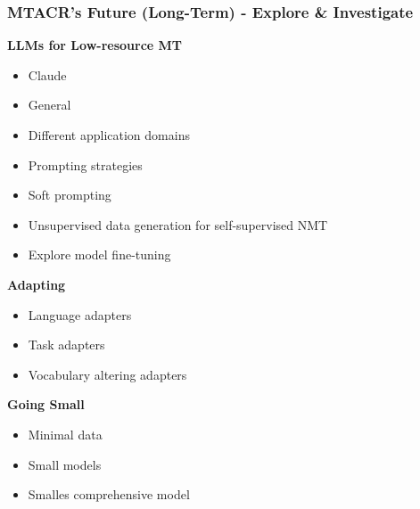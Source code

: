 \documentclass[aspectratio=169]{beamer}
\begin{document}
\begin{frame}[fragile]
	\frametitle{MTACR's Future (Long-Term) - Explore \& Investigate}
    \begin{minipage}{.50\textwidth}
    \footnotesize
    \textbf{LLMs for Low-resource MT}
    \begin{itemize}
        \item Claude \citep{enis2024LLMNMTAdvancing} %
        \item General \citep{richburg2024HowMultilingualAre} %
        \item Different application domains \citep{zheng2024HowWellLLMs} %
        \item Prompting strategies \citep{schulhoff2024PromptReportSystematic} %
        \item Soft prompting \citep{vykopal2024SoftLanguagePrompts} %
        \item Unsupervised data generation for self-supervised NMT \citep{ruiter2021IntegratingUnsupervisedDataa} %
        \item Explore model fine-tuning
    \end{itemize}
    \end{minipage}%
    \begin{minipage}{.50\textwidth}
    \footnotesize
    \textbf{Adapting}
    \begin{itemize}
        \item Language adapters \citep{gurgurov2024AdaptingMultilingualLLMs, parovic2022BADXBilingualAdapters, ustun2022UDapterTypologybasedLanguage} %
        \item Task adapters \citep{held2023TADATaskAgnosticDialect, pfeiffer2021AdapterFusionNonDestructiveTask, pfeiffer2020MADXAdapterBasedFramework} %
        \item Vocabulary altering adapters \citep{han2024AdaptersAlteringLLM} %
    \end{itemize}
    \textbf{Going Small}
    \begin{itemize}
        \item Minimal data \citep{maillard2023SmallDataBig} %
        \item Small models \citep{gurgurov2025SmallModelsBig} %
        \item Smalles comprehensive model \citep{eldan2023TinyStoriesHowSmall} %
    \end{itemize}
    \end{minipage}
\end{frame}
\end{document}

